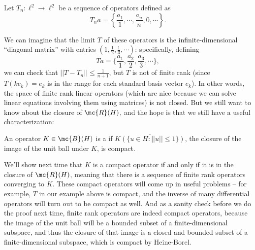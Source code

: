 \begin{example}
Let $T_n: \ell^2 \to \ell^2$ be a sequence of operators defined as 
\[
    T_n a = \left\{\frac{a_1}{1}, \cdots, \frac{a_n}{n}, 0, \cdots\right\}.
\]
\end{example}

We can imagine that the limit $T$ of these operators is the infinite-dimensional ``diagonal matrix'' with entries $(1, \frac{1}{2}, \frac{1}{3}, \cdots)$: specifically, defining
\[
    Ta = \{\frac{a_1}{1}, \frac{a_2}{2}, \frac{a_3}{3}, \cdots\},
\]
we can check that $||T - T_n|| \le \frac{1}{n+1}$, but $T$ is not of finite rank (since $T(ke_k) = e_k$ is in the range for each standard basis vector $e_k$). In other words, the space of finite rank linear operators (which are nice because we can solve linear equations involving them using matrices) is not closed. But we still want to know about the closure of $\mc{R}(H)$, and the hope is that we still have a useful characterization:

\begin{definition}
An operator $K \in \mc{B}(H)$ is a  if $\overline{K(\{u \in H: ||u|| \le 1\})}$, the closure of the image of the unit ball under $K$, is compact.
\end{definition}

We'll show next time that $K$ is a compact operator if and only if it is in the closure of $\mc{R}(H)$, meaning that there is a sequence of finite rank operators converging to $K$. These compact operators will come up in useful problems -- for example, $T$ in our example above is compact, and the inverse of many differential operators will turn out to be compact as well. And as a sanity check before we do the proof next time, finite rank operators are indeed compact operators, because the image of the unit ball will be a bounded subset of a finite-dimensional subspace, and thus the closure of that image is a closed and bounded subset of a finite-dimensional subspace, which is compact by Heine-Borel.